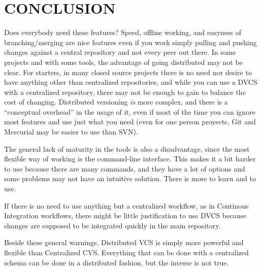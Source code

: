 \section{CONCLUSION}

Does everybody need these features? Speed, offline working, 
and easyness of branching/merging are nice features even if you work simply pulling 
and pushing changes against a central repository and not every peer out there. In some 
projects and with some tools, the advantage of going distributed may not be clear. 
For starters, in many closed source projects there is no need nor desire to have anything
other than centralized repositories, and while you can use a DVCS with a centralized
repository, there may not be enough to gain to balance the cost of changing. Distributed 
versioning \emph{is} more complex, and there is a ``conceptual overhead'' in the usage 
of it, even if most of the time you can ignore most features and use just what you need 
(even for one person proyects, Git and Mercurial may be easier to use than SVN).

The general lack of maturity in the tools is also a disadvantage, since the most flexible
way of working is the command-line interface. This makes it a bit harder to use because there 
are many commands, and they have a lot of options and some problems may not have an intuitive 
solution. There is more to learn and to use.

If there is no need to use anything but a centralized workflow, as in Continous Integration 
workflows, there might be little justification to use DVCS because changes are supposed to be 
integrated quickly in the main repository.

Beside these general warnings, Distributed VCS is simply more powerful and flexible than Centralized CVS.
Everything that can be done with a centralized schema can be done in a distributed fashion, but the inverse
is not true. 





